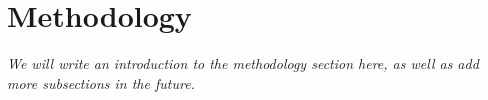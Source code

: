 \section{Methodology}\label{sec:methodology}
\textit{We will write an introduction to the methodology section here, as well as add more subsections in the future.}
